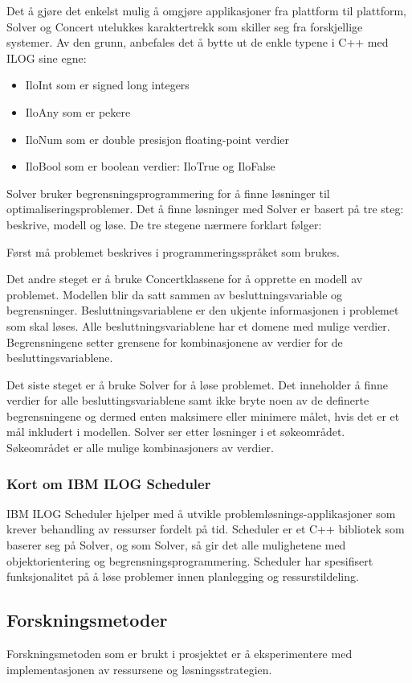 Det å gjøre det enkelst mulig å omgjøre applikasjoner fra plattform til plattform, Solver og Concert utelukkes karaktertrekk som skiller seg fra forskjellige systemer. Av den grunn, anbefales det å bytte ut de enkle typene i C++ med ILOG sine egne:
\begin{itemize}
\item IloInt som er signed long integers
\item IloAny som er pekere
\item IloNum som er double presisjon floating-point verdier
\item IloBool som er boolean verdier: IloTrue og IloFalse
\end{itemize}
Solver bruker begrensningsprogrammering for å finne løsninger til optimaliseringsproblemer. Det å finne løsninger med Solver er basert på tre steg: beskrive, modell og løse. De tre stegene nærmere forklart følger:

Først må problemet beskrives i programmeringsspråket som brukes.

Det andre steget er å bruke Concertklassene for å opprette en modell av problemet. Modellen blir da satt sammen av besluttningsvariable og begrensninger. Besluttningsvariablene er den ukjente informasjonen i problemet som skal løses. Alle besluttningsvariablene har et domene med mulige verdier. Begrensningene setter grensene for kombinasjonene av verdier for de besluttingsvariablene.

Det siste steget er å bruke Solver for å løse problemet. Det inneholder å finne verdier for alle besluttingsvariablene samt ikke bryte noen av de definerte begrensningene og dermed enten maksimere eller minimere målet, hvis det er et mål inkludert i modellen. Solver ser etter løsninger i et søkeområdet. Søkeområdet er alle mulige kombinasjoners av verdier.\cite{cpsolverilog}

\subsubsection{Kort om IBM ILOG Scheduler}
IBM ILOG Scheduler hjelper med å utvikle problemløsnings-applikasjoner som krever behandling av ressurser fordelt på tid. Scheduler er et C++ bibliotek som baserer seg på Solver, og som Solver, så gir det alle mulighetene med objektorientering og begrensningsprogrammering. Scheduler har spesifisert funksjonalitet på å løse problemer innen planlegging og ressurstildeling.\cite{cpschedulerilog}

\subsection{Forskningsmetoder}
Forskningsmetoden som er brukt i prosjektet er å eksperimentere med implementasjonen av ressursene og løsningsstrategien.

